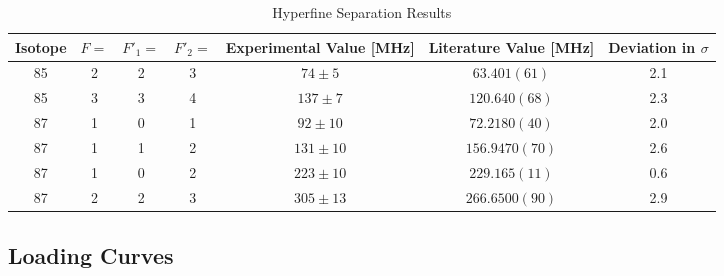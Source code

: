 \documentclass[12pt, a4paper]{article}
\begin{document}
\begin{table}[htb]
\begin{center}
\caption{Hyperfine Separation Results\protect\footnotemark}
\vspace{0.25mm}
\begin{tabular}{|c|c|c|c|c|c|c|}\hline
Isotope     & $F =$  & $F'_1 =$   & $F'_2 =$   & Experimental Value [MHz]   & Literature Value [MHz]     & Deviation in $\sigma$ \\\hline
85          & 2      & 2          & 3          & $74 \pm 5$                 & $63.401(61)$               & 2.1\\
85          & 3      & 3          & 4          & $137 \pm 7$                & $120.640(68)$              & 2.3\\
87          & 1      & 0          & 1          & $92 \pm 10$                & $72.2180(40)$              & 2.0\\
87          & 1      & 1          & 2          & $131 \pm 10$               & $156.9470(70)$             & 2.6\\
87          & 1      & 0          & 2          & $223 \pm 10$               & $229.165(11)$              & 0.6\\
87          & 2      & 2          & 3          & $305 \pm 13$               & $266.6500(90)$             & 2.9\\\hline
\end{tabular}

\end{center}
\end{table}



\newpage


\subsection{Loading Curves}
\end{document}
